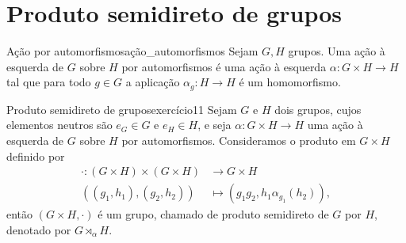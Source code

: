 \section{Produto semidireto de grupos}
\begin{definition}{Ação por automorfismos}{ação_automorfismos}
    Sejam \(G, H\) grupos. Uma ação à esquerda de \(G\) sobre \(H\) por automorfismos é uma ação à esquerda \(\alpha : G \times H \to H\) tal que para todo \(g \in G\) a aplicação \(\alpha_{g} : H \to H\) é um homomorfismo.
\end{definition}

\begin{proposition}{Produto semidireto de grupos}{exercício11}
    Sejam \(G\) e \(H\) dois grupos, cujos elementos neutros são \(e_G \in G\) e \(e_H \in H\), e seja \(\alpha : G \times H \to H\) uma ação à esquerda de \(G\) sobre \(H\) por automorfismos. Consideramos o produto em \(G \times H\) definido por
    \begin{align*}
        \cdot : (G \times H) \times (G \times H) &\to G\times H\\
                \left((g_1,h_1),(g_2,h_2)\right) &\mapsto \left(g_1 g_2, h_1 \alpha_{g_1}(h_2)\right),
    \end{align*}
    então \((G \times H, \cdot)\) é um grupo, chamado de produto semidireto de \(G\) por \(H\), denotado por \(G \rtimes_{\alpha} H\).
\end{proposition}
